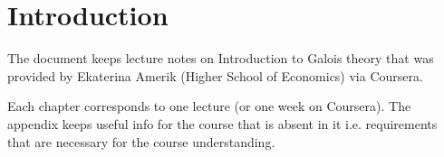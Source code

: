 \chapter*{Introduction}

The document keeps lecture notes on Introduction to Galois theory that
was provided by Ekaterina Amerik (Higher School of Economics) via
Coursera.

Each chapter corresponds to one lecture (or one week on Coursera). The
appendix keeps useful info for the course that is absent in it
i.e. requirements that are necessary for the course understanding.
